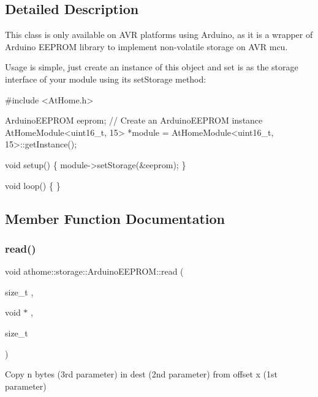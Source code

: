 \subsection{Detailed Description}
This class is only available on A\+VR platforms using Arduino, as it is a wrapper of Arduino E\+E\+P\+R\+OM library to implement non-\/volatile storage on A\+VR mcu.

Usage is simple, just create an instance of this object and set is as the storage interface of your module using its set\+Storage method\+:


\begin{DoxyCode}
\textcolor{preprocessor}{#include <AtHome.h>}

ArduinoEEPROM eeprom; \textcolor{comment}{// Create an ArduinoEEPROM instance}
AtHomeModule<uint16\_t, 15> *module = AtHomeModule<uint16\_t, 15>::getInstance();

\textcolor{keywordtype}{void} setup() \{
  module->setStorage(&eeprom);
\}

\textcolor{keywordtype}{void} loop() \{
\}
\end{DoxyCode}
 

\subsection{Member Function Documentation}
\mbox{\label{classathome_1_1storage_1_1_arduino_e_e_p_r_o_m_a853674189981dd3395ea76911d2eb1a0}} 
\subsubsection{\texorpdfstring{read()}{read()}}
{\footnotesize\ttfamily void athome\+::storage\+::\+Arduino\+E\+E\+P\+R\+O\+M\+::read (\begin{DoxyParamCaption}\item[{size\+\_\+t}]{,  }\item[{void $\ast$}]{,  }\item[{size\+\_\+t}]{ }\end{DoxyParamCaption})\hspace{0.3cm}{\ttfamily [virtual]}}

Copy n bytes (3rd parameter) in dest (2nd parameter) from offset x (1st parameter)

